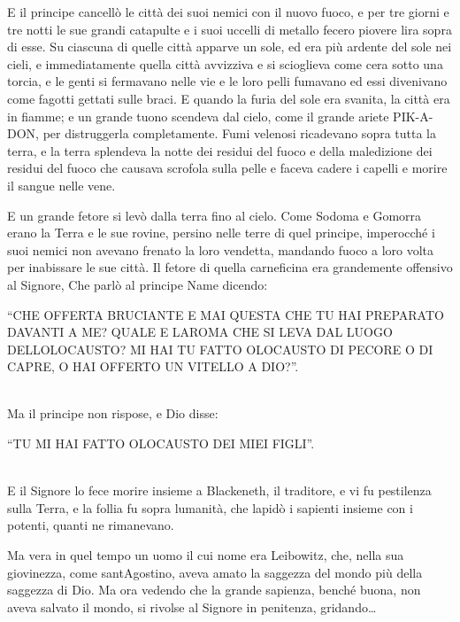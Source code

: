 E il principe cancellò le città dei suoi nemici con il nuovo fuoco, e
per tre giorni e tre notti le sue grandi catapulte e i suoi uccelli di
metallo fecero piovere l\textquotesingle ira sopra di esse. Su ciascuna
di quelle città apparve un sole, ed era più ardente del sole nei cieli,
e immediatamente quella città avvizziva e si scioglieva come cera sotto
una torcia, e le genti si fermavano nelle vie e le loro pelli fumavano
ed essi divenivano come fagotti gettati sulle braci. E quando la furia
del sole era svanita, la città era in fiamme; e un grande tuono scendeva
dal cielo, come il grande ariete PIK-A-DON, per distruggerla
completamente. Fumi velenosi ricadevano sopra tutta la terra, e la terra
splendeva la notte dei residui del fuoco e della maledizione dei residui
del fuoco che causava scrofola sulla pelle e faceva cadere i capelli e
morire il sangue nelle vene.

E un grande fetore si levò dalla terra fino al cielo. Come Sodoma e
Gomorra erano la Terra e le sue rovine, persino nelle terre di quel
principe, imperocché i suoi nemici non avevano frenato la loro vendetta,
mandando fuoco a loro volta per inabissare le sue città. Il fetore di
quella carneficina era grandemente offensivo al Signore, Che parlò al
principe Name dicendo:
\leavevmode\\
\begin{center}
	{\large{``CHE OFFERTA BRUCIANTE E MAI QUESTA CHE TU HAI
			PREPARATO DAVANTI A ME? QUALE E L\textquotesingle AROMA CHE SI LEVA DAL
			LUOGO DELL\textquotesingle OLOCAUSTO? MI HAI TU FATTO OLOCAUSTO DI
			PECORE O DI CAPRE, O HAI OFFERTO UN VITELLO A DIO?''.}}
\end{center}
\leavevmode\\
Ma il principe non rispose, e Dio disse: 
\leavevmode\\
\begin{center}
	{\large{``TU MI HAI FATTO OLOCAUSTO DEI MIEI FIGLI''.}}
\end{center}
\leavevmode\\
E il Signore lo fece morire insieme a Blackeneth, il traditore, e vi fu
pestilenza sulla Terra, e la follia fu sopra l\textquotesingle umanità,
che lapidò i sapienti insieme con i potenti, quanti ne rimanevano.

Ma v\textquotesingle era in quel tempo un uomo il cui nome era
Leibowitz, che, nella sua giovinezza, come
sant\textquotesingle Agostino, aveva amato la saggezza del mondo più
della saggezza di Dio. Ma ora vedendo che la grande sapienza, benché
buona, non aveva salvato il mondo, si rivolse al Signore in penitenza,
gridando\ldots{}

